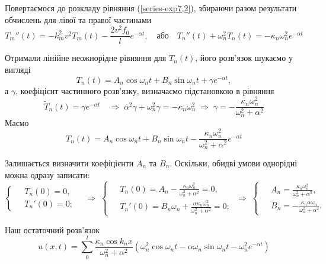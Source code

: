 Повертаємося до розкладу рівняння (\ref{series-exp7,2}), збираючи разом результати обчислень для лівої та правої частинами
\begin{equation}
    T_m''(t) = - k_m^2v^2 T_m(t)  - \frac{2v^2 f_0}{l} e^{-\alpha t}, \quad \text{або} \quad T_n''(t) + \omega_n^2 T_n(t) = - \kappa_n \omega_n^2  e^{-\alpha t}
\end{equation}

Отримали лінійне неожнорідне рівняння для $T_n(t)$, його розв'язок шукаємо у вигляді
\begin{equation}
    T_n(t) = A_n \cos\omega_nt + B_n \sin\omega_nt + \gamma e^{-\alpha t},
\end{equation}
а $\gamma$, коефіцієнт частинного розв'язку, визначаємо підстановкою в рівняння
\begin{equation*}
    \widetilde{T}_n(t) = \gamma e^{-\alpha t} 
    \quad\Rightarrow\;
    \alpha^2\gamma + \omega_n^2\gamma = - \kappa_n \omega_n^2
    \;\Rightarrow\;
    \gamma = - \frac{\kappa_n \omega_n^2}{\omega_n^2 + \alpha^2}
\end{equation*} 
Маємо
\begin{equation}
    T_n(t) = A_n \cos\omega_nt + B_n \sin\omega_nt - \frac{\kappa_n \omega_n^2}{\omega_n^2 + \alpha^2} e^{-\alpha t}
\end{equation}

Залишається визначити коефіцієнти $A_n$ та $B_n$. Оскільки, обидві умови однорідні можна одразу записати:
\begin{equation*}
    \left\{ \begin{aligned}
        \;&T_n(0) = 0,\\
        &T_n'(0) = 0; 
    \end{aligned} \right.
    \quad\Rightarrow\;
    \left\{ \begin{aligned}
        \;&T_n(0) = A_n - \frac{\kappa_n \omega_n^2}{\omega_n^2 + \alpha^2} = 0,\\
        &T_n'(0) = B_n\omega_n + \frac{\alpha \kappa_n \omega_n^2}{\omega_n^2 + \alpha^2} = 0; 
    \end{aligned} \right.
    \;\Rightarrow\;
    \left\{ \begin{aligned}
        \;&A_n = \frac{\kappa_n \omega_n^2}{\omega_n^2 + \alpha^2},\\
        &B_n = - \frac{\kappa_n \alpha \omega_n}{\omega_n^2 + \alpha^2}. 
    \end{aligned} \right.
\end{equation*}

Наш остаточний розв'язок 
\begin{equation}
    u(x,t) = \sum\limits_0^l \frac{\kappa_n \cos k_nx}{\omega_n^2 + \alpha^2} \left(\omega_n^2 \cos\omega_nt - \alpha \omega_n \sin\omega_nt - \omega_n^2 e^{-\alpha t} \right)
\end{equation}

%